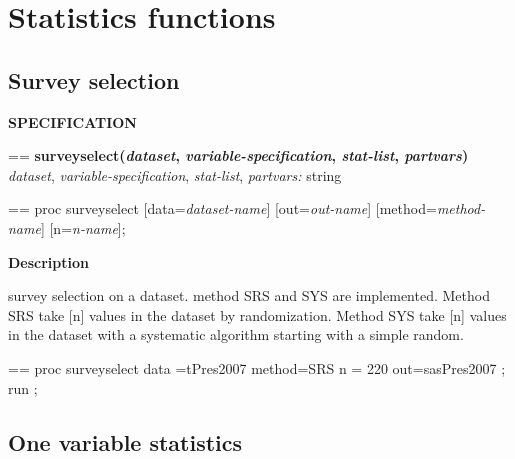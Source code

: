 \documentclass{book}
\makeatletter
\newcommand\Texinfocommandstyletextvar[1]{{\normalfont{}\textsl{#1}}}%
\newenvironment{Texinfopreformatted}{%
  \par\GNUTobeylines\obeyspaces\frenchspacing\parskip=\z@\parindent=\z@}{}
{\catcode`\^^M=13 \gdef\GNUTobeylines{\catcode`\^^M=13 \def^^M{\null\par}}}
\newenvironment{Texinfoindented}{\begin{list}{}{}\item\relax}{\end{list}}
\renewcommand{\_}{\Texinfounderscore\discretionary{}{}{}}
\makeatother
\begin{document}
\chapter{{Statistics functions}}
\label{anchor:Statistics-functions}%


\section{{Survey selection}}
\label{anchor:Survey-selection}%
\noindent{}\textbf{SPECIFICATION}
\begin{Texinfoindented}
\begin{Texinfopreformatted}%
\textbf{surveyselect(\Texinfocommandstyletextvar{dataset}, \Texinfocommandstyletextvar{variable-specification}, \Texinfocommandstyletextvar{stat-list}, \Texinfocommandstyletextvar{partvars})}
\Texinfocommandstyletextvar{dataset}, \Texinfocommandstyletextvar{variable-specification}, \Texinfocommandstyletextvar{stat-list}, \Texinfocommandstyletextvar{partvars:} string
\end{Texinfopreformatted}
\end{Texinfoindented}

\begin{Texinfoindented}
\begin{Texinfopreformatted}%
proc surveyselect [data=\Texinfocommandstyletextvar{dataset-name}] [out=\Texinfocommandstyletextvar{out-name}]  [method=\Texinfocommandstyletextvar{method-name}]  [n=\Texinfocommandstyletextvar{n-name}];
\end{Texinfopreformatted}
\end{Texinfoindented}

%

\noindent{}\textbf{Description}

survey selection on a dataset.
method SRS and SYS are implemented.
Method SRS take [n] values in the dataset by randomization. 
Method SYS take [n] values in the dataset with a systematic algorithm starting with a simple random.

\begin{Texinfoindented}
\begin{Texinfopreformatted}%
\ttfamily proc surveyselect data =tPres2007 method=SRS  n = 220 out=sasPres2007 ;
run ;
\end{Texinfopreformatted}
\end{Texinfoindented}

\section{{One variable statistics}}
\label{anchor:One-variable-statistics}%
\end{document}
